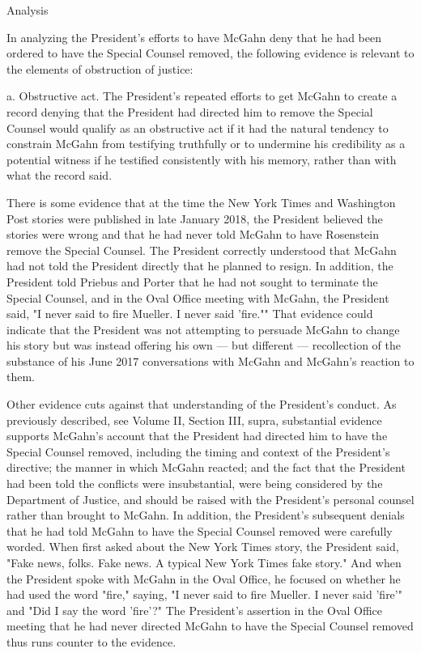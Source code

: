 {Analysis

In analyzing the President's efforts to have McGahn deny that he had been ordered to have the Special Counsel removed, the following evidence is relevant to the elements of obstruction of justice:

a. Obstructive act.
The President's repeated efforts to get McGahn to create a record denying that the President had directed him to remove the Special Counsel would qualify as an obstructive act if it had the natural tendency to constrain McGahn from testifying truthfully or to undermine his credibility as a potential witness if he testified consistently with his memory, rather than with what the record said.

There is some evidence that at the time the New York Times and Washington Post stories were published in late January 2018, the President believed the stories were wrong and that he had never told McGahn to have Rosenstein remove the Special Counsel.
The President correctly understood that McGahn had not told the President directly that he planned to resign.
In addition, the President told Priebus and Porter that he had not sought to terminate the Special Counsel, and in the Oval Office meeting with McGahn, the President said, "I never said to fire Mueller.
I never said 'fire.""
That evidence could indicate that the President was not attempting to persuade McGahn to change his story but was instead offering his own — but different — recollection of the substance of his June 2017 conversations with McGahn and McGahn's reaction to them.

Other evidence cuts against that understanding of the President's conduct.
As previously described, see Volume II, Section III, supra, substantial evidence supports McGahn's account that the President had directed him to have the Special Counsel removed, including the timing and context of the President's directive;
the manner in which McGahn reacted;
and the fact that the President had been told the conflicts were insubstantial, were being considered by the Department of Justice, and should be raised with the President's personal counsel rather than brought to McGahn.
In addition, the President's subsequent denials that he had told McGahn to have the Special Counsel removed were carefully worded.
When first asked about the New York Times story, the President said, "Fake news, folks.
Fake news.
A typical New York Times fake story." And when the President spoke with McGahn in the Oval Office, he focused on whether he had used the word "fire," saying, "I never said to fire Mueller.
I never said 'fire'" and "Did I say the word 'fire'?" The President's assertion in the Oval Office meeting that he had never directed McGahn to have the Special Counsel removed thus runs counter to the evidence.

}
